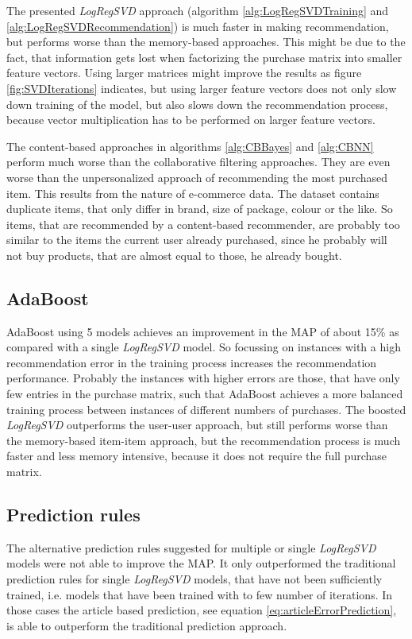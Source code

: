 \documentclass[10pt]{reportMaster}
\begin{document}
The presented \textit{LogRegSVD} approach (algorithm \ref{alg:LogRegSVDTraining} and \ref{alg:LogRegSVDRecommendation}) is much faster in making recommendation, but performs worse than the memory-based approaches.
This might be due to the fact, that information gets lost when factorizing the purchase matrix into smaller feature vectors.
Using larger matrices might improve the results as figure \ref{fig:SVDIterations} indicates, but using larger feature vectors does not only slow down training of the model, but also slows down the recommendation process, because vector multiplication has to be performed on larger feature vectors.

The content-based approaches in algorithms \ref{alg:CBBayes} and \ref{alg:CBNN} perform much worse than the collaborative filtering approaches.
They are even worse than the unpersonalized approach of recommending the most purchased item.
This results from the nature of e-commerce data.
The dataset contains duplicate items, that only differ in brand, size of package, colour or the like.
So items, that are recommended by a content-based recommender, are probably too similar to the items the current user already purchased, since he probably will not buy products, that are almost equal to those, he already bought.


\subsection{AdaBoost}
\label{sec:discAdaBoost}
AdaBoost using 5 models achieves an improvement in the MAP of about 15\% as compared with a single \textit{LogRegSVD} model.
So focussing on instances with a high recommendation error in the training process increases the recommendation performance.
Probably the instances with higher errors are those, that have only few entries in the purchase matrix, such that AdaBoost achieves a more balanced training process between instances of different numbers of purchases.
The boosted \textit{LogRegSVD} outperforms the user-user approach, but still performs worse than the memory-based item-item approach, but the recommendation process is much faster and less memory intensive, because it does not require the full purchase matrix.

\subsection{Prediction rules}
\label{sec:discPredRules}
The alternative prediction rules suggested for multiple or single \textit{LogRegSVD} models were not able to improve the MAP.
It only outperformed the traditional prediction rules for single \textit{LogRegSVD} models, that have not been sufficiently trained, i.e. models that have been trained with to few number of iterations.
In those cases the article based prediction, see equation \ref{eq:articleErrorPrediction}, is able to outperform the traditional prediction approach.
\end{document}

